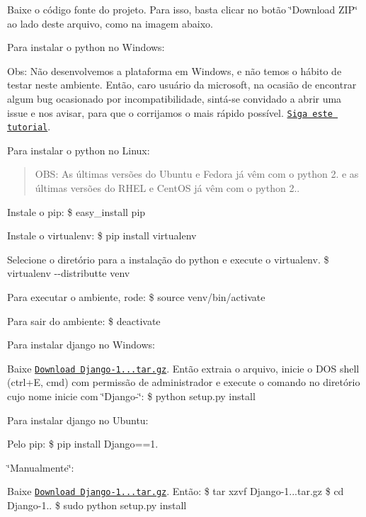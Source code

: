 \begin{DoxyEnumerate}
\item Baixe o código fonte do projeto. Para isso, basta clicar no botão \char`\"{}\+Download Z\+I\+P\char`\"{} ao lado deste arquivo, como na imagem abaixo. 
\item Para instalar o python no Windows\+:

Obs\+: Não desenvolvemos a plataforma em Windows, e não temos o hábito de testar neste ambiente. Então, caro usuário da microsoft, na ocasião de encontrar algum bug ocasionado por incompatibilidade, sintá-\/se convidado a abrir uma issue e nos avisar, para que o corrijamos o mais rápido possível. \href{http://docs.python-guide.org/en/latest/starting/install/win/}{\tt Siga este tutorial}.
\item Para instalar o python no Linux\+: \begin{quote}
O\+B\+S\+: As últimas versões do Ubuntu e Fedora já vêm com o python 2. e as últimas versões do R\+H\+E\+L e Cent\+O\+S já vêm com o python 2.. \end{quote}

\begin{DoxyItemize}
\item Instale o pip\+: {\ttfamily \$ easy\+\_\+install pip}
\item Instale o virtualenv\+: {\ttfamily \$ pip install virtualenv}
\item Selecione o diretório para a instalação do python e execute o virtualenv. {\ttfamily \$ virtualenv -\/-\/distributte venv}
\item Para executar o ambiente, rode\+: {\ttfamily \$ source venv/bin/activate}
\item Para sair do ambiente\+: {\ttfamily \$ deactivate}
\end{DoxyItemize}
\item Para instalar django no Windows\+:
\begin{DoxyItemize}
\item Baixe \href{https://www.djangoproject.com/download/1.7.1/tarball/}{\tt Download Django-\/1...\+tar.\+gz}. Então extraia o arquivo, inicie o D\+O\+S shell (ctrl+\+E, cmd) com permissão de administrador e execute o comando no diretório cujo nome inicie com \char`\"{}\+Django-\/\char`\"{}\+: {\ttfamily \$ python setup.\+py install}
\end{DoxyItemize}
\item Para instalar django no Ubuntu\+:
\begin{DoxyItemize}
\item Pelo pip\+: {\ttfamily \$ pip install Django==1.}
\item \char`\"{}\+Manualmente\char`\"{}\+:
\begin{DoxyItemize}
\item Baixe \href{https://www.djangoproject.com/download/1.7.1/tarball/}{\tt Download Django-\/1...\+tar.\+gz}. Então\+: {\ttfamily \$ tar xzvf Django-\/1...\+tar.\+gz} {\ttfamily \$ cd Django-\/1..} {\ttfamily \$ sudo python setup.\+py install} 
\end{DoxyItemize}
\end{DoxyItemize}
\end{DoxyEnumerate}
